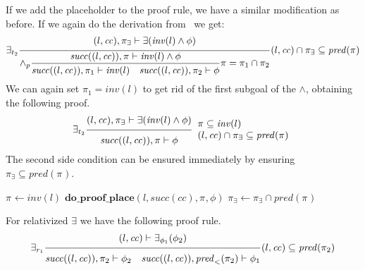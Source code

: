 \documentclass{article}
\newcommand{\proofrule}[3][]{#1 \frac{\raisebox{.7ex}{\normalsize{$#2$}}}
  {\raisebox{-1.0ex}{\normalsize{$#3$}}}}
\newcommand{\placeholder}[1][]{\pi_{#1}}
\newcommand{\loc}{l}
\newcommand{\region}{\mathit{cc}}
\newcommand{\suc}{\mathit{succ}}
\newcommand{\pre}{\mathit{pred}}
\newcommand{\inv}{\mathit{inv}}
\newcommand{\method}[1]{\ensuremath{\mathbf{#1}}}
\begin{document}
If we add the placeholder to the proof rule, we have a similar modification as
before. If we again do the derivation from~\cite[Appendix C.2]{FC:14report} we get:
\[
\proofrule[\exists_{t_2}]
{(\loc, \region), \placeholder[\exists] \vdash \exists(\inv(\loc) \land \phi)}
{\proofrule[\land_p]
  {\suc((\loc, \region)), \placeholder \vdash \inv(\loc) \land \phi}
  {\suc((\loc, \region)), \placeholder[1] \vdash \inv(\loc)
   \quad \suc((\loc, \region)), \placeholder[2] \vdash \phi}
  \placeholder = \placeholder[1] \cap \placeholder[2]
}
(\loc, \region) \cap \placeholder[\exists] \subseteq \pre(\placeholder)
\]
We can again set $\placeholder[1] = \inv(\loc)$ to get rid of the first subgoal of the $\land$,
obtaining the following proof.
\[
\proofrule[\exists_{t_2}]
{(\loc, \region), \placeholder[\exists] \vdash \exists(\inv(\loc) \land \phi)}
{\suc((\loc, \region)), \placeholder \vdash \phi}
\begin{array}{l}
\placeholder \subseteq \inv(l)\\
(\loc, \region) \cap \placeholder[\exists] \subseteq \pre(\placeholder)
\end{array}
\]
The second side condition can be ensured immediately by ensuring $\placeholder[\exists] \subseteq \pre(\placeholder)$.

\begin{algorithm}[H]
\caption{$\method{do\_proof\_exists\_place}(\loc, \region, \placeholder[\exists], \exists(\phi))$}
\begin{algorithmic}
\STATE $\placeholder \gets \inv(\loc)$ 
\STATE $\method{do\_proof\_place}(\loc, \suc(\region), \placeholder, \phi)$
\STATE $\placeholder[\exists] \gets \placeholder[\exists] \cap \pre(\placeholder)$
\end{algorithmic}
\end{algorithm}


For relativized $\exists$ we have the following proof rule.
\[
\proofrule[\exists_{r_1}]
{(\loc, \region) \vdash \exists_{\phi_1}(\phi_2)}
{\suc((\loc,\region)), \placeholder[2] \vdash \phi_2
\quad
\suc((\loc, \region)), \pre_{<}(\placeholder[2]) \vdash \phi_1
}
(\loc, \region) \subseteq \pre(\placeholder[2])
\]
\end{document}
